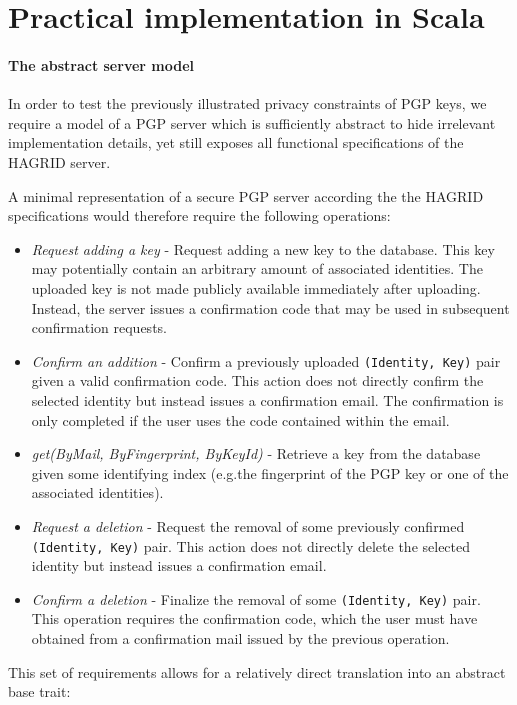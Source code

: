 
\section{Practical implementation in Scala}
\paragraph{The abstract server model}
In order to test the previously illustrated privacy constraints of PGP keys, we require a model of a PGP server which is sufficiently abstract to hide irrelevant implementation details, yet still exposes all functional specifications of the HAGRID server.

A minimal representation of a secure PGP server according the the HAGRID specifications would therefore require the following operations:
\begin{itemize}
    \item \emph{Request adding a key} - Request adding a new key to the database. This key may potentially contain an arbitrary amount of associated identities. The uploaded key is not made publicly available immediately after uploading. Instead, the server issues a confirmation code that may be used in subsequent confirmation requests.
    \item \emph{Confirm an addition} - Confirm a previously uploaded \texttt{(Identity, Key)} pair given a valid confirmation code. This action does not directly confirm the selected identity but instead issues a confirmation email. The confirmation is only completed if the user uses the code contained within the email.
    \item \emph{get(ByMail, ByFingerprint, ByKeyId)} - Retrieve a key from the database given some identifying index (e.g.the fingerprint of the PGP key or one of the associated identities).
    \item \emph{Request a deletion} - Request the removal of some previously confirmed \texttt{(Identity, Key)} pair. This action does not directly delete the selected identity but instead issues a confirmation email.
    \item \emph{Confirm a deletion} - Finalize the removal of some \texttt{(Identity, Key)} pair. This operation requires the confirmation code, which the user must have obtained from a confirmation mail issued by the previous operation.
\end{itemize}
This set of requirements allows for a relatively direct translation into an abstract base trait: 
